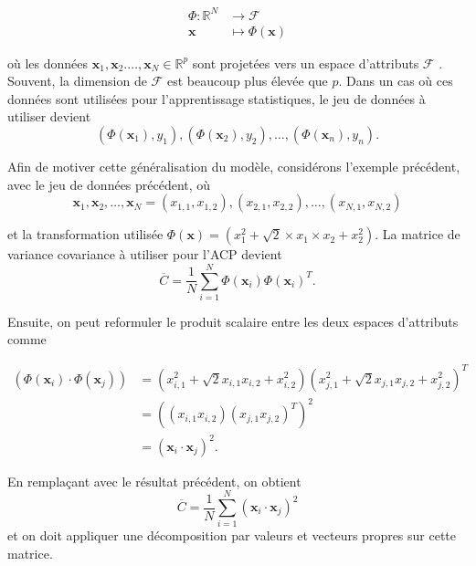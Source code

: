 \begin{align}\label{eq:featurespace}
\Phi : \mathbb{R}^N &\to \mathcal{F} \nonumber \\
\textbf{x} &\mapsto \Phi(\textbf{x}) 
\end{align}

où les données $\textbf{x}_1, \textbf{x}_2. \dots, \textbf{x}_N \in \mathbb{R}^p$ sont projetées vers un espace d'attributs 
$\mathcal{F}$ \cite{muller2001introduction}. Souvent, la dimension de $\mathcal{F}$ est beaucoup plus élevée que $p$. Dans un cas où ces données sont utilisées pour l'apprentissage statistiques, 
le jeu de données à utiliser devient $$(\Phi(\textbf{x}_1), y_1), (\Phi(\textbf{x}_2), y_2), \dots, (\Phi(\textbf{x}_n), y_n).$$

Afin de motiver cette généralisation du modèle, considérons l'exemple précédent, avec le jeu de données précédent, où
$$\textbf{x}_1, \textbf{x}_2, \dots, \textbf{x}_N = (x_{1,1},x_{1,2}), (x_{2,1}, x_{2,2}), …, (x_{N,1}, x_{N,2})$$

et la transformation utilisée $\Phi(\textbf{x})= (x_1^2 + \sqrt{2} \times x_1\times x_2 + x_2^2)$. La matrice de variance covariance à utiliser pour l’ACP devient
$$\overline{C} = \frac{1}{N} \sum_{i = 1}^{N}   \Phi(\textbf{x}_i) \Phi(\textbf{x}_i)^{T}.$$

Ensuite, on peut reformuler le produit scalaire entre les deux espaces d'attributs comme

\begin{align*}
(\Phi(\textbf{x}_i) \cdot \Phi(\textbf{x}_j)) &= (x_{i, 1}^2 + \sqrt{2} x_{i, 1} x_{i, 2} + x_{i, 2}^2)(x_{j, 1}^2 + \sqrt{2} x_{j, 1} x_{j, 2} + x_{j, 2}^2)^T\\
&= ((x_{i, 1}x_{i, 2})(x_{j, 1}x_{j, 2})^T)^2\\
&= (\textbf{x}_i \cdot \textbf{x}_j)^2.
\end{align*}

En remplaçant avec le résultat précédent, on obtient
$$\overline{C} = \frac{1}{N} \sum_{i = 1}^{N} (\textbf{x}_i \cdot \textbf{x}_j)^2$$ et on doit appliquer une décomposition par valeurs et vecteurs propres sur cette matrice.